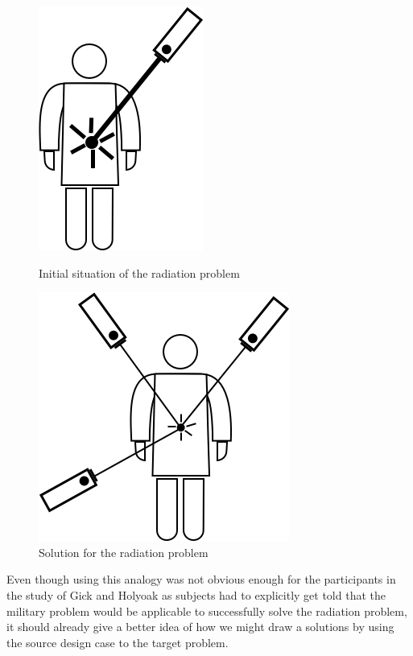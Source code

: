\documentclass[12pt]{article}
\begin{document}
\begin{figure}[H]
    \centering
    \begin{minipage}[b]{0.45\textwidth}
    	\includegraphics[scale=0.4]{images/laser_1.png}
    	\centering
    	\caption{Initial situation of the radiation problem}
    	\label{fig:radiation_problem}
    \end{minipage}
    \hfill
    \begin{minipage}[b]{0.45\textwidth}
    	\includegraphics[scale=0.4]{images/laser_2.png}
    	\centering
    	\caption{Solution for the radiation problem}
    	\label{fig:radiation_solution}
    \end{minipage}
\end{figure}
Even though using this analogy was not obvious enough for the participants in the study of Gick and Holyoak as subjects had to explicitly get told that the military problem would be applicable to successfully solve the radiation problem, it should already give a better idea of how we might draw a solutions by using the source design case to the target problem. \\
\end{document}
